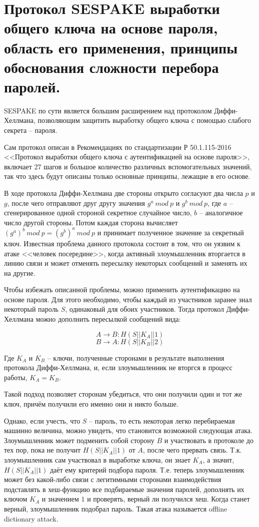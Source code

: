 \section{Протокол SESPAKE выработки общего ключа на основе пароля, область его применения, принципы обоснования сложности перебора паролей.}

SESPAKE по сути является большим расширением над протоколом Диффи-Хеллмана, позволяющим защитить выработку общего ключа с помощью слабого секрета -- пароля.

Сам протокол описан в Рекомендациях по стандартизации Р 50.1.115-2016 <<Протокол выработки общего ключа с аутентификацией на основе пароля>>, включает 27 шагов и большое количество различных вспомогательных значений, так что здесь будут описаны только основные принципы, лежащие в его основе. 

В ходе протокола Диффи-Хеллмана две стороны открыто согласуют два числа $p$ и $g$, после чего отправляют друг другу значения $g^a\ mod\ p$ и $g^b\ mod\ p$, где $a$ -- сгенерированное одной стороной секретное случайное число, $b$ -- аналогичное число другой стороны. Потом каждая сторона вычисляет $(g^a)^b\ mod\ p = (g^b)^a\ mod\ p$ и принимает полученное значение за секретный ключ. Известная проблема данного протокола состоит в том, что он уязвим к атаке <<человек посередине>>, когда активный злоумышленник вторгается в линию связи и может отменять пересылку некоторых сообщений и заменять их на другие. 

Чтобы избежать описанной проблемы, можно применить аутентификацию на основе пароля. Для этого необходимо, чтобы каждый из участников заранее знал некоторый пароль $S$, одинаковый для обоих участников. Тогда протокол Диффи-Хеллмана можно дополнить пересылкой сообщений вида:

$$ A \rightarrow B: H(S || K_A || 1) $$
$$ B \rightarrow A: H(S || K_B || 2) $$

Где $K_A$ и $K_B$ -- ключи, полученные сторонами в результате выполнения протокола Диффи-Хеллмана, и, если злоумышленник не вторгся в процесс работы, $K_A = K_B$. 

Такой подход позволяет сторонам убедиться, что они получили один и тот же ключ, причём получили его именно они и никто больше. 

Однако, если учесть, что $S$ -- пароль, то есть некоторая легко перебираемая машинно величина, можно увидеть, что становится возможной следующая атака. Злоумышленник может подменить собой сторону $B$ и участвовать в протоколе до тех пор, пока не получит $H(S || K_A || 1)$ от $A$, после чего прервать связь. Т.к. злоумышленник сам участвовал в выработке ключа, он знает $K_A$, а значит, $H(S || K_A || 1)$ даёт ему критерий подбора пароля. Т.е. теперь злоумышленник может без какой-либо связи с легитимными сторонами взаимодействия подставлять в хеш-функцию все подбираемые значения паролей, дополнять их ключом $K_A$ и значением $1$ и проверять, верный ли получился хеш. Когда станет верный, злоумышленник подобрал пароль. Такая атака называется offline dictionary attack. 

